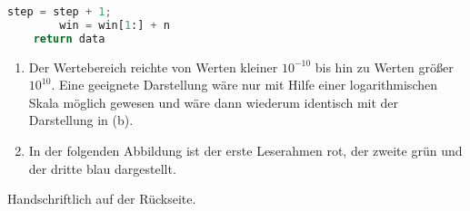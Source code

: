 \documentclass{homework}
\begin{document}
\begin{enumerate}
\begin{lstlisting}[language=python]
		step = step + 1;
		win = win[1:] + n
	return data
\end{lstlisting}

\begin{enumerate}
\item Der Wertebereich reichte von Werten kleiner $10^{-10}$ bis hin zu Werten
größer $10^{10}$. Eine geeignete Darstellung wäre nur mit Hilfe einer
logarithmischen Skala möglich gewesen und wäre dann wiederum identisch mit der
Darstellung in (b).

\item In der folgenden Abbildung ist der erste Leserahmen rot, der zweite grün
und der dritte blau dargestellt.

\begin{center}
\setlength{\unitlength}{0.3mm}

\end{center}
\end{enumerate}


Handschriftlich auf der Rückseite.


\end{enumerate}
\end{document}
